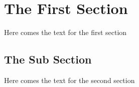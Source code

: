 \documentclass[a4paper,12pt,portrait]{article}
\begin{document}
\section{{The First Section}}

Here comes the text for the first section

\subsection{{The Sub Section}}

Here comes the text for the second section
\end{document}
